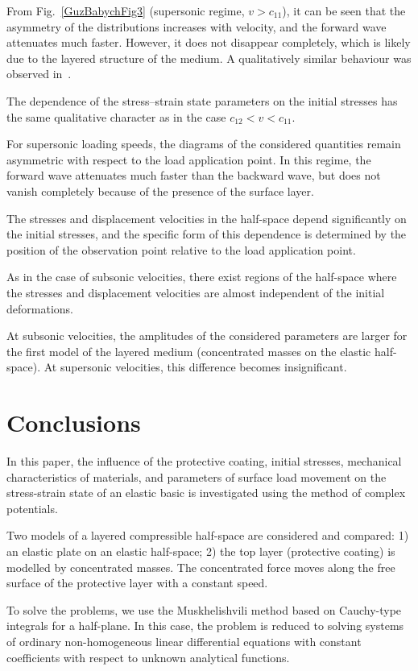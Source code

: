 From Fig.~\ref{GuzBabychFig3} (supersonic regime, $v>c_{11}$), it can be seen that the asymmetry of the distributions increases with velocity, and the forward wave attenuates much faster. However, it does not disappear completely, which is likely due to the layered structure of the medium. A qualitatively similar behaviour was observed in~\cite{GuzBabych2,GuzBabych10}.

The dependence of the stress--strain state parameters on the initial stresses has the same qualitative character as in the case $c_{12}<v<c_{11}$.

For supersonic loading speeds, the diagrams of the considered quantities remain asymmetric with respect to the load application point. In this regime, the forward wave attenuates much faster than the backward wave, but does not vanish completely because of the presence of the surface layer.

The stresses and displacement velocities in the half-space depend significantly on the initial stresses, and the specific form of this dependence is determined by the position of the observation point relative to the load application point.

As in the case of subsonic velocities, there exist regions of the half-space where the stresses and displacement velocities are almost independent of the initial deformations.

At subsonic velocities, the amplitudes of the considered parameters are larger for the first model of the layered medium (concentrated masses on the elastic half-space). At supersonic velocities, this difference becomes insignificant.

\section{Conclusions}

In this paper, the influence of the protective coating, initial stresses, mechanical characteristics of materials, and parameters of surface load movement on the stress-strain state of an elastic basic is investigated using the method of complex potentials.

Two models of a layered compressible half-space are considered and compared: 1) an elastic plate on an elastic half-space; 2) the top layer (protective coating) is modelled by concentrated masses. The concentrated force moves along the free surface of the protective layer with a constant speed.

To solve the problems, we use the Muskhelishvili method based on Cauchy-type integrals for a half-plane. In this case, the problem is reduced to solving systems of ordinary non-homogeneous linear differential equations with constant coefficients with respect to unknown analytical functions.

